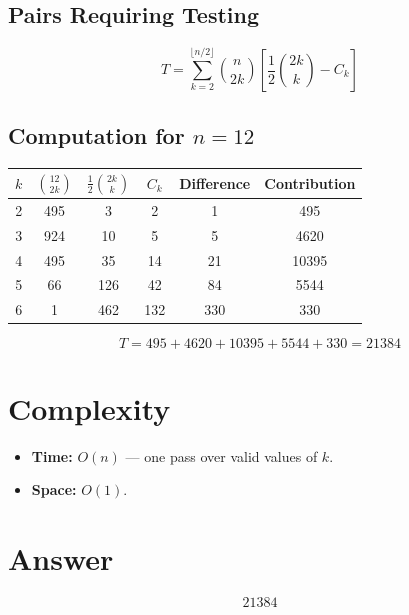 \documentclass[12pt,a4paper]{article}
\begin{document}
\subsection{Pairs Requiring Testing}

\[
T = \sum_{k=2}^{\lfloor n/2 \rfloor} \binom{n}{2k} \left[ \frac{1}{2}\binom{2k}{k} - C_k \right]
\]

\subsection{Computation for $n = 12$}

\begin{center}
\begin{tabular}{@{}cccccc@{}}
\toprule
$k$ & $\binom{12}{2k}$ & $\frac{1}{2}\binom{2k}{k}$ & $C_k$ & Difference & Contribution \\
\midrule
2 & 495 & 3 & 2 & 1 & 495 \\
3 & 924 & 10 & 5 & 5 & 4620 \\
4 & 495 & 35 & 14 & 21 & 10395 \\
5 & 66 & 126 & 42 & 84 & 5544 \\
6 & 1 & 462 & 132 & 330 & 330 \\
\bottomrule
\end{tabular}
\end{center}

\[
T = 495 + 4620 + 10395 + 5544 + 330 = \boxed{21384}
\]

\section{Complexity}

\begin{itemize}
    \item \textbf{Time:} $O(n)$ --- one pass over valid values of $k$.
    \item \textbf{Space:} $O(1)$.
\end{itemize}

\section{Answer}

\[
\boxed{21384}
\]
\end{document}
